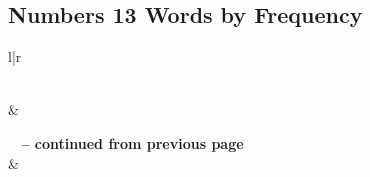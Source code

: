 

\subsection{Numbers 13 Words by Frequency}


\normalsize
 
\begin{center}
\begin{longtable}{l|r}
\caption[Numbers 13 Words by Frequency]{Numbers 13 Words by Frequency}\label{table:WordsbyFrequency for Numbers 13} \\
\hline {} &  \\ \hline 
\endfirsthead
 
{{\bfseries \tablename\ \thetable{} -- continued from previous page}} \\  
\hline {} &  \\ \hline 
\endhead
 

\end{longtable}
\end{center}
